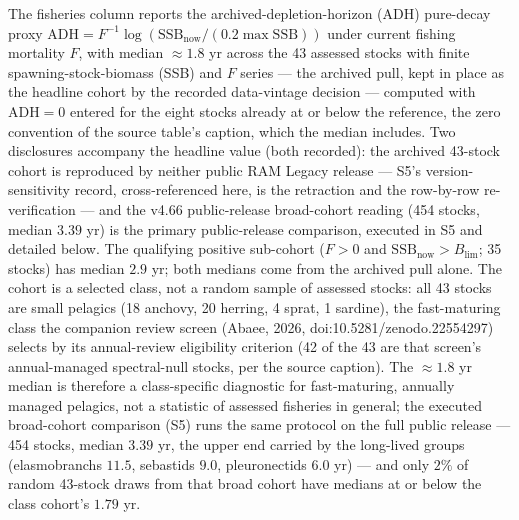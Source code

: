 \documentclass[11pt]{article}
\begin{document}
The fisheries column reports the archived-depletion-horizon (ADH)
pure-decay proxy
\(\mathrm{ADH} = F^{-1}\log(\mathrm{SSB}_{\mathrm{now}}/(0.2\max\mathrm{SSB}))\)
under current fishing mortality \(F\), with median \(\approx 1.8\) yr
across the 43 assessed stocks with finite spawning-stock-biomass (SSB)
and \(F\) series --- the archived pull, kept in place as the headline
cohort by the recorded data-vintage decision --- computed with
\(\mathrm{ADH} = 0\) entered for the eight stocks already at or below
the reference, the zero convention of the source table's caption, which
the median includes. Two disclosures accompany the headline value (both
recorded): the archived 43-stock cohort is reproduced by neither public
RAM Legacy release --- S5's version-sensitivity record, cross-referenced
here, is the retraction and the row-by-row re-verification --- and the
v4.66 public-release broad-cohort reading (454 stocks, median \(3.39\)
yr) is the primary public-release comparison, executed in S5 and
detailed below. The qualifying positive sub-cohort (\(F > 0\) and
\(\mathrm{SSB}_{\mathrm{now}} > B_{\lim}\); 35 stocks) has median
\(2.9\) yr; both medians come from the archived pull alone. The cohort
is a selected class, not a random sample of assessed stocks: all 43
stocks are small pelagics (18 anchovy, 20 herring, 4 sprat, 1 sardine),
the fast-maturing class the companion review screen (Abaee, 2026, doi:10.5281/zenodo.22554297) selects by its annual-review eligibility criterion (42 of the
43 are that screen's annual-managed spectral-null stocks, per the source
caption). The \(\approx 1.8\) yr median is therefore a class-specific
diagnostic for fast-maturing, annually managed pelagics, not a statistic
of assessed fisheries in general; the executed broad-cohort comparison
(S5) runs the same protocol on the full public release --- 454 stocks,
median \(3.39\) yr, the upper end carried by the long-lived groups
(elasmobranchs \(11.5\), sebastids \(9.0\), pleuronectids \(6.0\) yr)
--- and only \(2\%\) of random 43-stock draws from that broad cohort
have medians at or below the class cohort's \(1.79\) yr.
\end{document}

